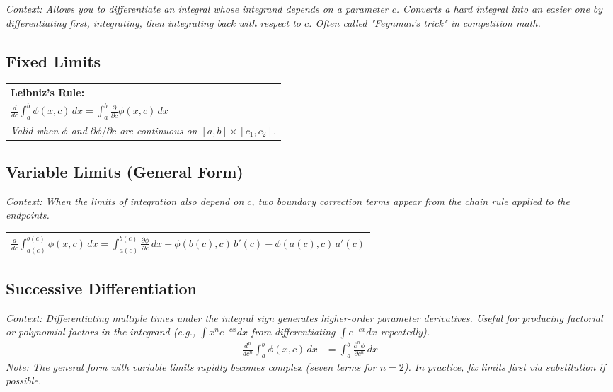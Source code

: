 \documentclass[11pt, a4paper]{article}
\begin{document}
\textit{\small Context: Allows you to differentiate an integral whose integrand depends on a parameter $c$. Converts a hard integral into an easier one by differentiating first, integrating, then integrating back with respect to $c$. Often called "Feynman's trick" in competition math.}

\subsection*{\color{secondary} Fixed Limits}
\begin{center}
\begin{tabular}{@{}p{}@{}}
\toprule
\textbf{\color{accent}Leibniz's Rule:} \\
$\displaystyle \frac{d}{dc} \int_a^b \phi(x, c)\, dx = \int_a^b \frac{\partial}{\partial c} \phi(x, c)\, dx$ \\
\textit{\small Valid when $\phi$ and $\partial\phi/\partial c$ are continuous on $[a,b] \times [c_1, c_2]$.} \\
\bottomrule
\end{tabular}
\end{center}

\vspace{0.3cm}

\subsection*{\color{secondary} Variable Limits (General Form)}
\textit{\small Context: When the limits of integration also depend on $c$, two boundary correction terms appear from the chain rule applied to the endpoints.}
\begin{center}
\begin{tabular}{@{}p{}@{}}
\toprule
$\displaystyle \frac{d}{dc} \int_{a(c)}^{b(c)} \phi(x, c)\, dx = \int_{a(c)}^{b(c)} \frac{\partial \phi}{\partial c}\, dx + \phi(b(c), c)\, b'(c) - \phi(a(c), c)\, a'(c)$ \\
\bottomrule
\end{tabular}
\end{center}

\vspace{0.3cm}

\subsection*{\color{secondary} Successive Differentiation}
\textit{\small Context: Differentiating multiple times under the integral sign generates higher-order parameter derivatives. Useful for producing factorial or polynomial factors in the integrand (e.g., $\int x^n e^{-cx} dx$ from differentiating $\int e^{-cx} dx$ repeatedly).}
\begin{align*}
    \frac{d^n}{dc^n} \int_a^b \phi(x, c)\, dx &= \int_a^b \frac{\partial^n \phi}{\partial c^n}\, dx
\end{align*}
\textit{\small Note: The general form with variable limits rapidly becomes complex (seven terms for $n=2$). In practice, fix limits first via substitution if possible.}
\end{document}
